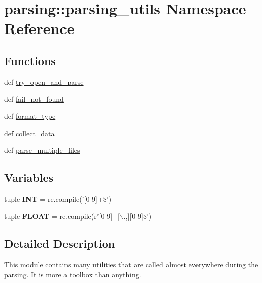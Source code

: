 \hypertarget{namespaceparsing_1_1parsing__utils}{\section{parsing\-:\-:parsing\-\_\-utils \-Namespace \-Reference}
\label{namespaceparsing_1_1parsing__utils}
}
\subsection*{\-Functions}
\begin{DoxyCompactItemize}
\item 
def \hyperlink{namespaceparsing_1_1parsing__utils_a7766f495ec63ea3ec43b446542f0c265}{try\-\_\-open\-\_\-and\-\_\-parse}
\item 
def \hyperlink{namespaceparsing_1_1parsing__utils_aa37d7f4d02758ee50cf19143898a6e7b}{fail\-\_\-not\-\_\-found}
\item 
def \hyperlink{namespaceparsing_1_1parsing__utils_a362c249cf422cf0688c6affd6182b28a}{format\-\_\-type}
\item 
def \hyperlink{namespaceparsing_1_1parsing__utils_a731c5b9c31a252e6835d2d3d5cfab1ff}{collect\-\_\-data}
\item 
def \hyperlink{namespaceparsing_1_1parsing__utils_a96ec9674eafc29d3fd8c80d745b95a65}{parse\-\_\-multiple\-\_\-files}
\end{DoxyCompactItemize}
\subsection*{\-Variables}
\begin{DoxyCompactItemize}
\item 
\hypertarget{namespaceparsing_1_1parsing__utils_a22eab78f27e686839ea7acd860543dab}{tuple {\bfseries \-I\-N\-T} = re.\-compile('\mbox{[}0-\/9\mbox{]}+\$')}\label{namespaceparsing_1_1parsing__utils_a22eab78f27e686839ea7acd860543dab}

\item 
\hypertarget{namespaceparsing_1_1parsing__utils_ae1f4c0d3c84cef253ebac3fa9471a33f}{tuple {\bfseries \-F\-L\-O\-A\-T} = re.\-compile(r'\mbox{[}0-\/9\mbox{]}+\mbox{[}$\backslash$.,\mbox{]}\mbox{[}0-\/9\mbox{]}\$')}\label{namespaceparsing_1_1parsing__utils_ae1f4c0d3c84cef253ebac3fa9471a33f}

\end{DoxyCompactItemize}


\subsection{\-Detailed \-Description}
\begin{DoxyVerb}
This module contains many utilities that are called almost everywhere
during the parsing.
It is more a toolbox than anything.
\end{DoxyVerb}
 

